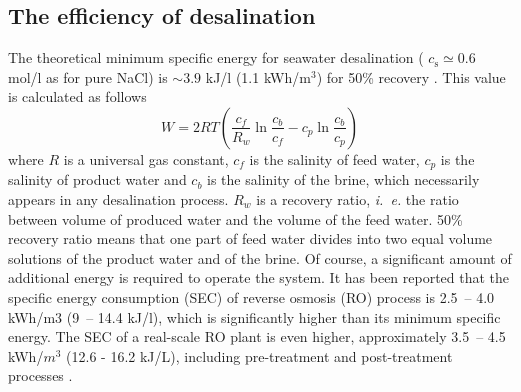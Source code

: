 \documentclass[journal,article,submit,pdftex,moreauthors]{Definitions/mdpi}
\newcommand{\ie}{\textit{i.~e.} }
\newcommand{\cs}{c_{\mathrm{s}}}
\begin{document}
\subsection{The efficiency of desalination}
The theoretical minimum specific energy for seawater desalination (
$\cs\simeq0.6$ mol/l as for pure NaCl) is $\sim3.9$ kJ/l (1.1 kWh/m$^3$) for 50\% recovery \cite{Wang_2020}.
This value is calculated as follows 
\begin{equation}
W=2RT\left(\frac{c_{f}}{R_{w}}\ln\frac{c_{b}}{c_{f}}-c_{p}\ln\frac{c_{b}}{c_{p}}\right)
\label{eq:SEC}
\end{equation}
where $R$ is a universal gas constant, $c_{f}$ is the salinity of feed water, $c_p$ is the salinity of product water and $c_b$ is the salinity of the brine, which necessarily appears in any desalination process. 
$R_{w}$ is a recovery ratio, \ie the ratio between volume of produced water and the volume of the feed water. 
50\% recovery ratio means that one part of feed water divides into two equal volume solutions of the product water and of the brine.
Of course, a significant amount of additional energy is required to operate the system\cite{Kim_2019}. 
It has been reported that the specific energy consumption (SEC) of reverse osmosis (RO) process is 2.5~-- 4.0 kWh/m3 (9~-- 14.4 kJ/l), which is significantly higher than its minimum specific energy.
The SEC of a real-scale RO plant is even higher, approximately 3.5~-- 4.5 kWh/$m^{3}$ (12.6 - 16.2 kJ/L), including pre-treatment and post-treatment processes \cite{Kim_2018}. 
\end{document}
